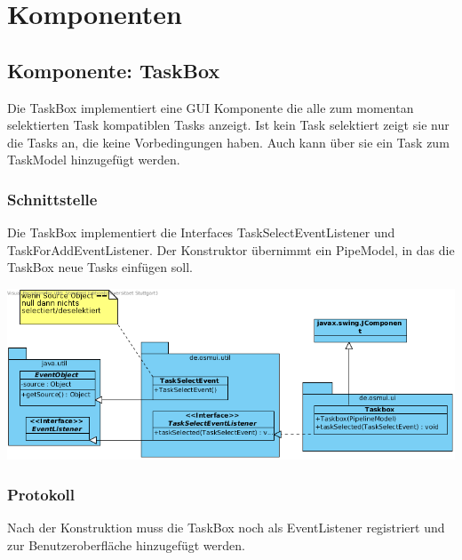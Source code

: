 \documentclass[a4paper,12pt]{scrartcl}
\begin{document}

\section{Komponenten}
\subsection{Komponente: TaskBox}
Die TaskBox implementiert eine GUI Komponente die alle zum momentan selektierten Task kompatiblen Tasks anzeigt. Ist kein Task selektiert zeigt sie nur die Tasks an, die keine Vorbedingungen haben. Auch kann über sie ein Task zum TaskModel hinzugefügt werden.
\subsubsection{Schnittstelle}
Die TaskBox implementiert die Interfaces TaskSelectEventListener und TaskForAddEventListener. Der  Konstruktor übernimmt ein PipeModel, in das die TaskBox neue Tasks einfügen soll. 
\begin{center}
\includegraphics[width=17cm]{Schnittstelle_TaskBox.png}
\end{center}
\subsubsection{Protokoll}
Nach der Konstruktion muss die TaskBox noch als EventListener registriert und zur Benutzeroberfläche hinzugefügt werden.

\end{document}
